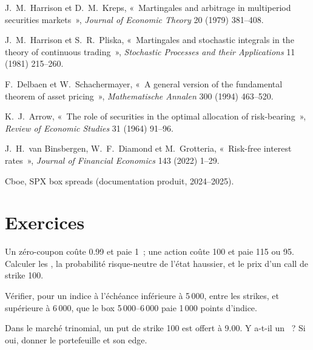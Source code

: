 \begin{omsources}
\item J.~M.~Harrison et D.~M.~Kreps, «~Martingales and arbitrage in multiperiod
securities markets~», \emph{Journal of Economic Theory} 20 (1979) 381--408.
\item J.~M.~Harrison et S.~R.~Pliska, «~Martingales and stochastic integrals in
the theory of continuous trading~», \emph{Stochastic Processes and their
Applications} 11 (1981) 215--260.
\item F.~Delbaen et W.~Schachermayer, «~A general version of the fundamental
theorem of asset pricing~», \emph{Mathematische Annalen} 300 (1994) 463--520.
\item K.~J.~Arrow, «~The role of securities in the optimal allocation of
risk-bearing~», \emph{Review of Economic Studies} 31 (1964) 91--96.
\item J.~H.~van Binsbergen, W.~F.~Diamond et M.~Grotteria, «~Risk-free
interest rates~», \emph{Journal of Financial Economics} 143 (2022) 1--29.
\item Cboe, SPX box spreads (documentation produit, 2024--2025).
\end{omsources}

\section{Exercices}

\begin{exercise}[$\star$]\label{exo:dv:no-arbitrage-and-the-fundamental-theorems:1}
Un zéro-coupon coûte 0.99 et paie 1~; une action coûte 100 et paie 115 ou 95. Calculer les
, la probabilité risque-neutre de l'état haussier, et le prix d'un call de
strike 100.
\end{exercise}

\begin{exercise}[$\star$]\label{exo:dv:no-arbitrage-and-the-fundamental-theorems:2}
Vérifier, pour un indice à l'échéance inférieure à 5\,000, entre les strikes, et supérieure
à 6\,000, que le box 5\,000--6\,000 paie 1\,000 points d'indice.
\end{exercise}

\begin{exercise}[$\star$]\label{exo:dv:no-arbitrage-and-the-fundamental-theorems:3}
Dans le marché trinomial, un put de strike 100 est offert à 9.00. Y a-t-il un
~? Si oui, donner le portefeuille et son edge.
\end{exercise}

